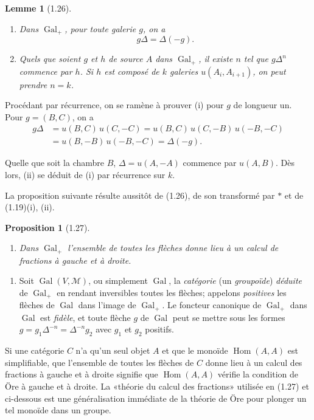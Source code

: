 \documentclass[12pt]{article}
\newtheorem{proposition}[theoreme]{Proposition}
\newtheorem{lemme}[theoreme]{Lemme}
\theoremstyle{remark}
\DeclareMathOperator{\Gal}{Gal}
\DeclareMathOperator{\Hom}{Hom}
\begin{document}
\begin{lemme}[1.26]
\begin{enumerate}
\item[(i)] Dans $\Gal_+$, pour toute galerie $g$, on a
\[g \Delta = \Delta(-g).\]
\item[(ii)] Quels que soient $g$ et $h$ de source $A$ dans $\Gal_+$, il existe $n$ tel que $g \Delta^n$ commence par $h$. Si $h$ est composé de $k$ galeries $u(A_i, A_{i+1})$, on peut prendre $n = k$.
\end{enumerate}
\end{lemme}

Procédant par récurrence, on se ramène à prouver (i) pour $g$ de longueur un. Pour $g = (B, C)$, on a
\begin{align*}g \Delta &= u(B, C) \, u(C, -C) = u(B, C) \, u(C, -B) \, u(-B, -C) \\&= u(B, -B) \, u(-B, -C) = \Delta(-g).\end{align*}

Quelle que soit la chambre $B$, $\Delta = u(A, -A)$ commence par $u(A, B)$. Dès lors, (ii) se déduit de (i) par récurrence sur $k$.

La proposition suivante résulte aussitôt de (1.26), de son transformé par $*$ et de (1.19)(i), (ii).

\begin{proposition}[1.27]
\begin{enumerate}
\item[(i)] Dans $\Gal_+$ l'ensemble de toutes les flèches donne lieu à un calcul de fractions à gauche et à droite.
\end{enumerate}
\end{proposition}

\begin{enumerate}
\item[(ii)] Soit $\Gal(V, \mathcal{M})$, ou simplement $\Gal$, la \emph{catégorie} (un \emph{groupoïde}) \emph{déduite} de $\Gal_+$ en rendant inversibles toutes les flèches; appelons \emph{positives} les flèches de $\Gal$ dans l'image de $\Gal_+$. Le foncteur canonique de $\Gal_+$ dans $\Gal$ est \emph{fidèle}, et toute flèche $g$ de $\Gal$ peut se mettre sous les formes $g = g_1 \Delta^{-n} = \Delta^{-n} g_2$ avec $g_1$ et $g_2$ positifs.
\end{enumerate}

Si une catégorie $C$ n'a qu'un seul objet $A$ et que le monoïde $\Hom(A, A)$ est simplifiable, que l'ensemble de toutes les flèches de $C$ donne lieu à un calcul des fractions à gauche et à droite signifie que $\Hom(A, A)$ vérifie la condition de Öre à gauche et à droite. La «théorie du calcul des fractions» utilisée en (1.27) et ci-dessous est une généralisation immédiate de la théorie de Öre pour plonger un tel monoïde dans un groupe.
\end{document}
